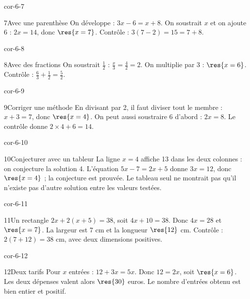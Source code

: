 \begin{blocLivre}{cor-6-7}\begin{corrige}{7}{Avec une parenthèse}
On développe : $3x-6=x+8$. On soustrait $x$ et on ajoute 6 : $2x=14$, donc $\res{x=7}$. Contrôle : $3(7-2)=15=7+8$.
\end{corrige}\end{blocLivre}
\begin{blocLivre}{cor-6-8}\begin{corrige}{8}{Avec des fractions}
On soustrait $\frac12$ : $\frac x3=\frac42=2$. On multiplie par 3 : $\res{x=6}$. Contrôle : $\frac63+\frac12=\frac52$.
\end{corrige}\end{blocLivre}
\begin{blocLivre}{cor-6-9}\begin{corrige}{9}{Corriger une méthode}
En divisant par 2, il faut diviser tout le membre : $x+3=7$, donc $\res{x=4}$. On peut aussi soustraire 6 d’abord : $2x=8$. Le contrôle donne $2\times4+6=14$.
\end{corrige}\end{blocLivre}
\begin{blocLivre}{cor-6-10}\begin{corrige}{10}{Conjecturer avec un tableur}
La ligne $x=4$ affiche 13 dans les deux colonnes : on conjecture la solution 4. L’équation $5x-7=2x+5$ donne $3x=12$, donc $\res{x=4}$ ; la conjecture est prouvée. Le tableau seul ne montrait pas qu’il n’existe pas d’autre solution entre les valeurs testées.
\label{fig-cor-6-10}
\end{corrige}\end{blocLivre}
\begin{blocLivre}{cor-6-11}\begin{corrige}{11}{Un rectangle}
$2x+2(x+5)=38$, soit $4x+10=38$. Donc $4x=28$ et $\res{x=7}$. La largeur est 7 cm et la longueur $\res{12}$ cm. Contrôle : $2(7+12)=38$ cm, avec deux dimensions positives.
\label{fig-cor-6-11}
\end{corrige}\end{blocLivre}
\begin{blocLivre}{cor-6-12}\begin{corrige}{12}{Deux tarifs}
Pour $x$ entrées : $12+3x=5x$. Donc $12=2x$, soit $\res{x=6}$. Les deux dépenses valent alors $\res{30}$ euros. Le nombre d’entrées obtenu est bien entier et positif.
\end{corrige}\end{blocLivre}
